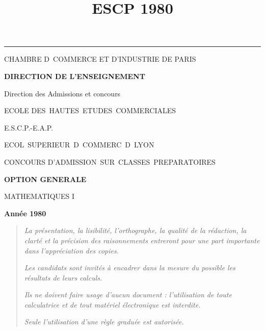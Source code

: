 \documentclass[11pt]{article}%
\title{\bf \vspace{-2cm} ESCP 1980} %
\author{} %
\date{} %
\begin{document}
\maketitle %
\vspace{-1.4cm}\hrule %
\thispagestyle{fancy}

\vspace*{.2cm}




\begin{center}
{\small CHAMBRE D\E\ COMMERCE ET D'INDUSTRIE DE PARIS}

\textbf{DIRECTION DE L'ENSEIGNEMENT}

Direction des Admissions et concours

\underline{\hspace*{3cm}}

{\Large ECOLE DES\ HAUTES\ ETUDES\ COMMERCIALES}

{\Large E.S.C.P.-E.A.P.}

{\Large ECOL\E\ SUPERIEUR\E\ D\E\ COMMERC\E\ D\E\ LYON}{\large }

CONCOURS D'ADMISSION\ SUR\ CLASSES\ PREPARATOIRES

\underline{\hspace*{3cm}}

\textbf{OPTION GENERALE}

{\Large MATHEMATIQUES I}

\textbf{Année 1980}

\underline{\hspace*{3cm}}
\end{center}

\begin{quotation}
\noindent \textsl{La présentation, la lisibilité, l'orthographe, la
qualité
de la rédaction, la clarté et la précision des raisonnements entreront
pour
une part importante dans l'appréciation des copies.}

\noindent \textsl{Les candidats sont invités à encadrer dans la mesure
du
possible les résultats de leurs calculs.}

\noindent \textsl{Ils ne doivent faire usage d'aucun document :
l'utilisation de toute calculatrice et de tout matériel électronique
est
interdite.}

\noindent \textsl{Seule l'utilisation d'une règle graduée est
autorisée.}

\noindent \textsl{\hrulefill }
\end{quotation}
\end{document}
